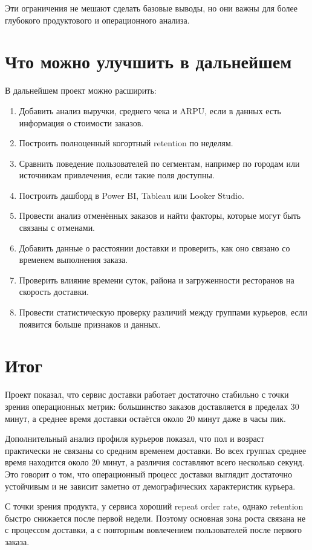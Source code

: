 \documentclass[12pt,a4paper]{article}
\begin{document}
Эти ограничения не мешают сделать базовые выводы, но они важны для более глубокого продуктового и операционного анализа.

\section{Что можно улучшить в дальнейшем}

В дальнейшем проект можно расширить:

\begin{enumerate}
    \item Добавить анализ выручки, среднего чека и ARPU, если в данных есть информация о стоимости заказов.
    \item Построить полноценный когортный retention по неделям.
    \item Сравнить поведение пользователей по сегментам, например по городам или источникам привлечения, если такие поля доступны.
    \item Построить дашборд в Power BI, Tableau или Looker Studio.
    \item Провести анализ отменённых заказов и найти факторы, которые могут быть связаны с отменами.
    \item Добавить данные о расстоянии доставки и проверить, как оно связано со временем выполнения заказа.
    \item Проверить влияние времени суток, района и загруженности ресторанов на скорость доставки.
    \item Провести статистическую проверку различий между группами курьеров, если появится больше признаков и данных.
\end{enumerate}

\section{Итог}

Проект показал, что сервис доставки работает достаточно стабильно с точки зрения операционных метрик: большинство заказов доставляется в пределах 30 минут, а среднее время доставки остаётся около 20 минут даже в часы пик.

Дополнительный анализ профиля курьеров показал, что пол и возраст практически не связаны со средним временем доставки. Во всех группах среднее время находится около 20 минут, а различия составляют всего несколько секунд. Это говорит о том, что операционный процесс доставки выглядит достаточно устойчивым и не зависит заметно от демографических характеристик курьера.

С точки зрения продукта, у сервиса хороший repeat order rate, однако retention быстро снижается после первой недели. Поэтому основная зона роста связана не с процессом доставки, а с повторным вовлечением пользователей после первого заказа.
\end{document}
